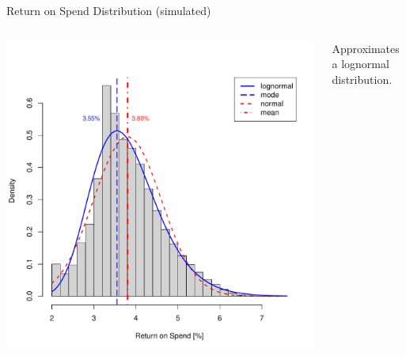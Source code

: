 \begin{frame}{Return on Spend Distribution (simulated)}
    \begin{columns}[c]
        \begin{column}{0.7\textwidth}
            \includegraphics[width=0.9\textheight]{../Figures/MC_ROS_Histogram.pdf}
        \end{column}
        \begin{column}{0.3\textwidth}
            \centering
            Approximates a lognormal distribution. 
        \end{column}
    \end{columns}
\end{frame} 


